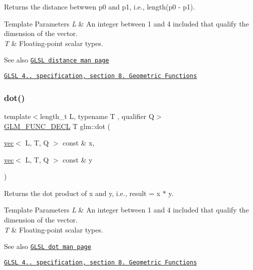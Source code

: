 Returns the distance betwwen p0 and p1, i.\+e., length(p0 -\/ p1).


\begin{DoxyTemplParams}{Template Parameters}
{\em L} & An integer between 1 and 4 included that qualify the dimension of the vector. \\
\hline
{\em T} & Floating-\/point scalar types.\\
\hline
\end{DoxyTemplParams}
\begin{DoxySeeAlso}{See also}
\href{http://www.opengl.org/sdk/docs/manglsl/xhtml/distance.xml}{\tt G\+L\+SL distance man page} 

\href{http://www.opengl.org/registry/doc/GLSLangSpec.4.20.8.pdf}{\tt G\+L\+SL 4.. specification, section 8. Geometric Functions} 
\end{DoxySeeAlso}
\mbox{\label{group__core__func__geometric_gaad6c5d9d39bdc0bf43baf1b22e147a0a}} 
\subsubsection{\texorpdfstring{dot()}{dot()}}
{\footnotesize\ttfamily template$<$length\+\_\+t L, typename T , qualifier Q$>$ \\
\mbox{\hyperlink{setup_8hpp_ab2d052de21a70539923e9bcbf6e83a51}{G\+L\+M\+\_\+\+F\+U\+N\+C\+\_\+\+D\+E\+CL}} T glm\+::dot (\begin{DoxyParamCaption}\item[{\mbox{\hyperlink{structglm_1_1vec}{vec}}$<$ L, T, Q $>$ const \&}]{x,  }\item[{\mbox{\hyperlink{structglm_1_1vec}{vec}}$<$ L, T, Q $>$ const \&}]{y }\end{DoxyParamCaption})}

Returns the dot product of x and y, i.\+e., result = x $\ast$ y.


\begin{DoxyTemplParams}{Template Parameters}
{\em L} & An integer between 1 and 4 included that qualify the dimension of the vector. \\
\hline
{\em T} & Floating-\/point scalar types.\\
\hline
\end{DoxyTemplParams}
\begin{DoxySeeAlso}{See also}
\href{http://www.opengl.org/sdk/docs/manglsl/xhtml/dot.xml}{\tt G\+L\+SL dot man page} 

\href{http://www.opengl.org/registry/doc/GLSLangSpec.4.20.8.pdf}{\tt G\+L\+SL 4.. specification, section 8. Geometric Functions} 
\end{DoxySeeAlso}
\mbox{\label{group__core__func__geometric_ga7aed0a36c738169402404a3a5d54e43b}} 
